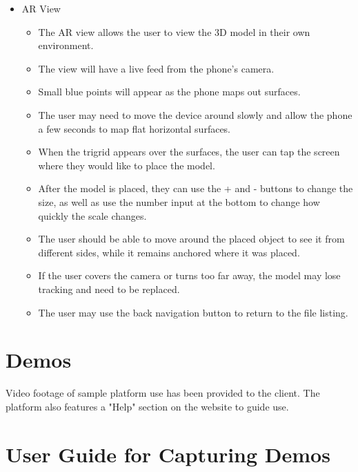 \begin{itemize}
\begin{itemize}
    \end{itemize}
    \item AR View
    \begin{itemize}
        \item The AR view allows the user to view the 3D model in their own environment.
        \item The view will have a live feed from the phone's camera.
        \item Small blue points will appear as the phone maps out surfaces.
        \item The user may need to move the device around slowly and allow the phone a few seconds to map flat horizontal surfaces.
        \item When the trigrid appears over the surfaces, the user can tap the screen where they would like to place the model.
        \item After the model is placed, they can use the + and - buttons to change the size, as well as use the number input at the bottom to change how quickly the scale changes.
        \item The user should be able to move around the placed object to see it from different sides, while it remains anchored where it was placed.
        \item If the user covers the camera or turns too far away, the model may lose tracking and need to be replaced.
        \item The user may use the back navigation button to return to the file listing.
    \end{itemize}
\end{itemize}

\section{Demos}

Video footage of sample platform use has been provided to the client. The platform also features a "Help" section on the website to guide use. 

\section{User Guide for Capturing Demos}

